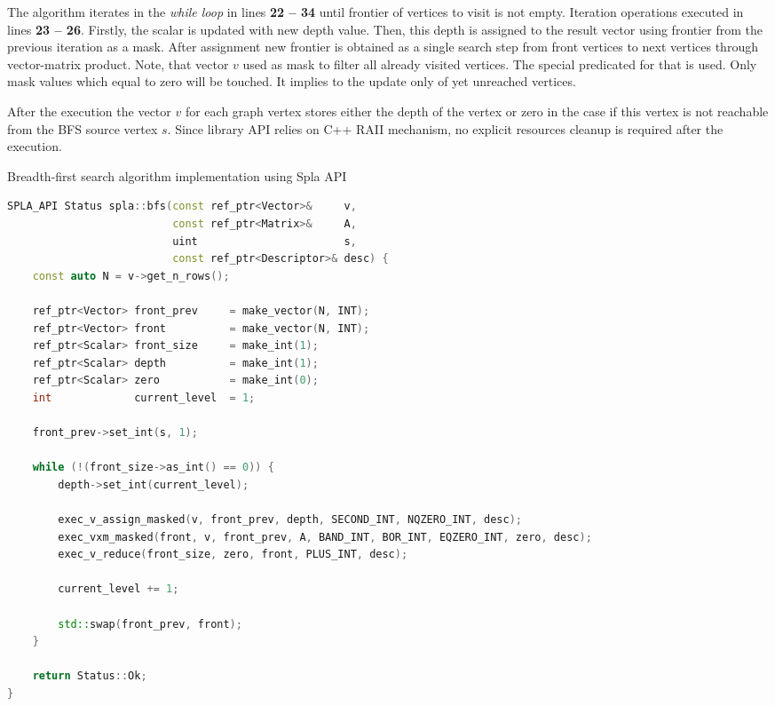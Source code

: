 The algorithm iterates in the \textit{while loop} in lines \textbf{22 -- 34} until frontier of vertices to visit is not empty. Iteration operations executed in lines \textbf{23 -- 26}. Firstly, the scalar is updated with new depth value. Then, this depth is assigned to the result vector using frontier from the previous iteration as a mask. After assignment new frontier is obtained as a single search step from front vertices to next vertices through vector-matrix product. Note, that vector $v$ used as mask to filter all already visited vertices. The special predicated for that is used. Only mask values which equal to zero will be touched. It implies to the update only of yet unreached vertices. 

After the execution the vector $v$ for each graph vertex stores either the depth of the vertex or zero in the case if this vertex is not reachable from the BFS source vertex $s$. Since library API relies on C++ RAII mechanism, no explicit resources cleanup is required after the execution.

\lstset{style=codelistingstyle}

\begin{algorithm}[]
\caption{Breadth-first search algorithm implementation using Spla API}
\label{alg:spla_bfs_example}
\begin{lstlisting}[language=C++]
SPLA_API Status spla::bfs(const ref_ptr<Vector>&     v,
                          const ref_ptr<Matrix>&     A,
                          uint                       s,
                          const ref_ptr<Descriptor>& desc) {
    const auto N = v->get_n_rows();

    ref_ptr<Vector> front_prev     = make_vector(N, INT);
    ref_ptr<Vector> front          = make_vector(N, INT);
    ref_ptr<Scalar> front_size     = make_int(1);
    ref_ptr<Scalar> depth          = make_int(1);
    ref_ptr<Scalar> zero           = make_int(0);
    int             current_level  = 1;
    
    front_prev->set_int(s, 1);

    while (!(front_size->as_int() == 0)) {
        depth->set_int(current_level);
        
        exec_v_assign_masked(v, front_prev, depth, SECOND_INT, NQZERO_INT, desc);
        exec_vxm_masked(front, v, front_prev, A, BAND_INT, BOR_INT, EQZERO_INT, zero, desc);
        exec_v_reduce(front_size, zero, front, PLUS_INT, desc);
        
        current_level += 1;

        std::swap(front_prev, front);
    }

    return Status::Ok;
}
\end{lstlisting}
\end{algorithm}